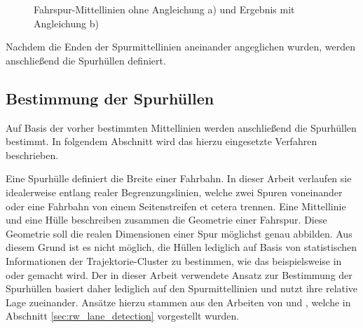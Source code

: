 \begin{figure}[H]
    \centering
    \qquad \qquad
    \caption[Ergebnis Spurenden-Angleichung]{Fahrspur-Mittellinien ohne Angleichung a) und Ergebnis mit Angleichung b)}
    \label{fig:real2_lane_alignment}
\end{figure}

Nachdem die Enden der Spurmittellinien aneinander angeglichen wurden, werden anschließend die Spurhüllen
definiert.

\subsection{Bestimmung der Spurhüllen}
\label{sec:real2_define_lane_envelope}

Auf Basis der vorher bestimmten Mittellinien werden anschließend die Spurhüllen bestimmt.
In folgendem Abschnitt wird das hierzu eingesetzte Verfahren beschrieben.

Eine Spurhülle definiert die Breite einer Fahrbahn. In dieser Arbeit verlaufen sie idealerweise entlang
realer Begrenzungslinien, welche zwei Spuren voneinander oder eine Fahrbahn von einem Seitenstreifen et cetera trennen.
Eine Mittellinie und eine Hülle beschreiben zusammen die Geometrie einer Fahrspur. Diese Geometrie
soll die realen Dimensionen einer Spur möglichst genau abbilden. Aus diesem Grund ist es nicht möglich,
die Hüllen lediglich auf Basis von statistischen Informationen der Trajektorie-Cluster zu bestimmen,
wie das beispielsweise in \cite[]{WeimingHu2006} oder \cite[]{Morris2011} gemacht wird.
Der in dieser Arbeit verwendete Ansatz zur Bestimmung der Spurhüllen basiert daher lediglich auf den
Spurmittellinien und nutzt ihre relative Lage zueinander. Ansätze hierzu stammen aus den Arbeiten von
\cite[]{Hsieh2006} und \cite[]{Makris2005}, welche in Abschnitt \ref{sec:rw_lane_detection} vorgestellt wurden.

